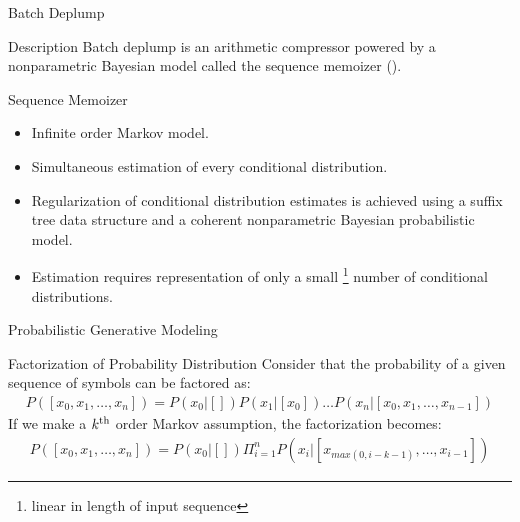 \documentclass{beamer}
\begin{document}
\begin{frame}[t]{Batch Deplump}
	\begin{block}{Description}
		Batch deplump is an arithmetic compressor powered by a nonparametric Bayesian model called the sequence memoizer (\citet{Wood2009}).
	\end{block}
	
	\begin{block}{Sequence Memoizer}
		\begin{itemize}
			\item Infinite order Markov model.
			\item Simultaneous estimation of every conditional distribution.
			\item Regularization of conditional distribution estimates is achieved using a suffix tree data structure and a coherent nonparametric Bayesian probabilistic model.
			\item Estimation requires representation of only a small \footnote{linear in length of input sequence} number of conditional distributions.
		\end{itemize}
	\end{block}
\end{frame}

\begin{frame}[t]{Probabilistic Generative Modeling}
	\begin{block}{Factorization of Probability Distribution}
		Consider that the probability of a given sequence of symbols can be factored as:
		\begin{eqnarray*}
			P([x_0, x_1, \ldots, x_n]) = P(x_0 | [])P(x_1 | [x_0]) \ldots P(x_n | [x_0, x_1, \ldots, x_{n-1}])
		\end{eqnarray*}
		If we make a $k^{\rm th}$ order Markov assumption, the factorization becomes:
		\begin{eqnarray*}
			P([x_0, x_1, \ldots, x_n]) = P(x_0  | [] ) \Pi_{i = 1}^n P(x_i | [x_{max(0, i-k-1)}, \ldots, x_{i-1}])
		\end{eqnarray*}
	\end{block}
\end{frame}
\end{document}

